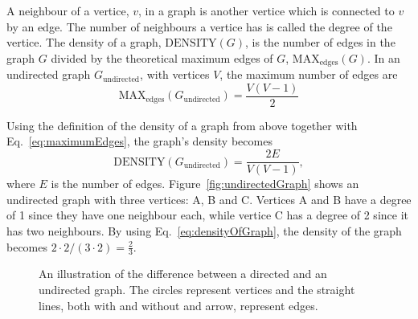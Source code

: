 A neighbour of a vertice, $v$, in a graph is another vertice which is connected to $v$ by an edge. The number of neighbours a vertice has is called the degree of the vertice. The density of a graph, $\mathrm{DENSITY}(G)$, is the number of edges in the graph $G$ divided by the theoretical maximum edges of $G$, $\mathrm{MAX}_\mathrm{edges}(G)$. In an undirected graph $G_\mathrm{undirected}$, with vertices $V$, the maximum number of edges are
\begin{equation}\label{eq:maximumEdges}
\mathrm{MAX}_\mathrm{edges}(G_\mathrm{undirected}) = \frac{V  (V-1)}{2}
\end{equation}

Using the definition of the density of a graph from above together with Eq.~\eqref{eq:maximumEdges}, the graph's density becomes
\begin{equation}\label{eq:densityOfGraph}
\mathrm{DENSITY}(G_\mathrm{undirected}) = \frac{2 E}{V(V-1)},
\end{equation}
where $E$ is the number of edges. Figure~\ref{fig:undirectedGraph} shows an undirected graph with three vertices: A, B and C. Vertices A and B have a degree of 1 since they have one neighbour each, while vertice C has a degree of 2 since it has two neighbours. By using Eq.~\eqref{eq:densityOfGraph}, the density of the graph becomes $2\cdot2 / (3\cdot2) = \frac{2}{3}$.

\begin{figure}[htbp]
    \centering
    \hfill
    \hfill
    \hfill
    \caption[The difference between a directed and an undirected graph.]{An illustration of the difference between  a directed and  an undirected graph. The circles represent vertices and the straight lines, both with and without and arrow, represent edges.}
    \label{fig:graph}
\end{figure}

\acresetall
